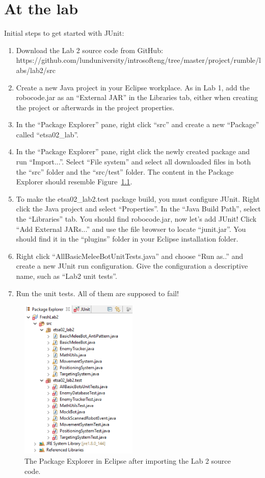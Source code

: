 \documentclass{scrreprt}
\begin{document}
\chapter{At the lab}
Initial steps to get started with JUnit:
\begin{enumerate}
\item Download the Lab 2 source code from GitHub:\\
https://github.com/lunduniversity/introsofteng/tree/master/project/rumble/labs/lab2/src
\item Create a new Java project in your Eclipse workplace. As in Lab 1, add the robocode.jar as an ``External JAR'' in the Libraries tab, either when creating the project or afterwards in the project properties.
\item In the ``Package Explorer'' pane, right click ``src'' and create a new ``Package'' called ``etsa02_lab''.
\item In the ``Package Explorer'' pane, right click the newly created package and run ``Import...''. Select ``File system'' and select all downloaded files in both the ``src'' folder and the ``src/test'' folder. The content in the Package Explorer should resemble Figure~\ref{fig:afterImport}.
\item To make the etsa02_lab2.test package build, you must configure JUnit. Right click the Java project and select ``Properties''. In the ``Java Build Path'', select the ``Libraries'' tab. You should find robocode.jar, now let's add JUnit! Click ``Add External JARs...'' and use the file browser to locate ``junit.jar''. You should find it in the ``plugins'' folder in your Eclipse installation folder.
\item Right click ``AllBasicMeleeBotUnitTests.java'' and choose ``Run as..'' and create a new JUnit run configuration. Give the configuration a descriptive name, such as ``Lab2 unit tests''.
\item Run the unit tests. All of them are supposed to fail!
\end{enumerate}

\begin{figure}
\centering
\includegraphics[width=0.5\textwidth]{figures/packageExplorerAfterImport.png}
\caption{The Package Explorer in Eclipse after importing the Lab 2 source code.}
\label{fig:afterImport}
\end{figure}
\end{document}
